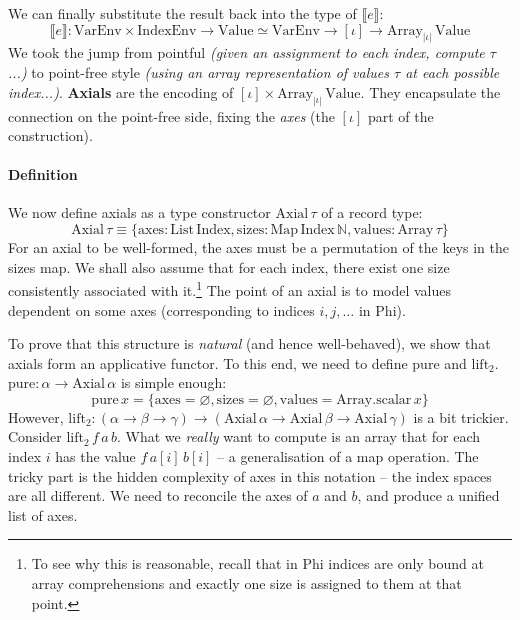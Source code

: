 We can finally substitute the result back into the type of $\llbracket e \rrbracket$:
$$ \boxed{ \llbracket e \rrbracket : \mathrm{VarEnv} \times \mathrm{IndexEnv} \to \mathrm{Value} \simeq \mathrm{VarEnv} \to  [\iota]  \to \mathrm{Array}_{|\iota|}\, \mathrm{Value} } $$
We took the jump from pointful \textit{(given an assignment to each index, compute $\tau$...)} to point-free style \textit{(using an array representation of values $\tau$ at each possible index...)}. \textbf{Axials} are the encoding of $[\iota] \times \mathrm{Array}_{|\iota|}\, \mathrm{Value}$. They encapsulate the connection on the point-free side, fixing the \textit{axes} (the $[\iota]$ part of the construction).

\paragraph{Definition} We now define axials as a type constructor $\mathrm{Axial}\,\tau$ of a record type:
$$ \mathrm{Axial}\,\tau \equiv \{ \mathrm{axes} : \mathrm{List}\,\mathrm{Index}, \mathrm{sizes} : \mathrm{Map}\,\mathrm{Index}\,\mathbb N, \mathrm{values} : \mathrm{Array}\,\tau \} $$
For an axial to be well-formed, the axes must be a permutation of the keys in the sizes map. We shall also assume that for each index, there exist one size consistently associated with it.\footnote{To see why this is reasonable, recall that in Phi indices are only bound at array comprehensions and exactly one size is assigned to them at that point.} The point of an axial is to model values dependent on some axes (corresponding to indices $i, j, \dots$ in Phi).

To prove that this structure is \textit{natural} (and hence well-behaved), we show that axials form an applicative functor. To this end, we need to define $\mathrm{pure}$ and $\mathrm{lift}_2$. $\mathrm{pure} : \alpha \to \mathrm{Axial}\,\alpha$ is simple enough:
$$ \mathrm{pure}\,x = \{ \mathrm{axes} = \varnothing, \mathrm{sizes} = \varnothing, \mathrm{values} = \mathrm{Array.scalar}\,x \} $$
However, $\mathrm{lift}_2 : (\alpha \to \beta \to \gamma) \to (\mathrm{Axial}\,\alpha \to \mathrm{Axial}\,\beta \to \mathrm{Axial}\,\gamma)$ is a bit trickier. Consider $\mathrm{lift}_2\,f\,a\,b$. What we \textit{really} want to compute is an array that for each index $i$ has the value $f\,a[i]\,b[i]$ -- a generalisation of a map operation. The tricky part is the hidden complexity of axes in this notation -- the index spaces are all different. We need to reconcile the axes of $a$ and $b$, and produce a unified list of axes.

